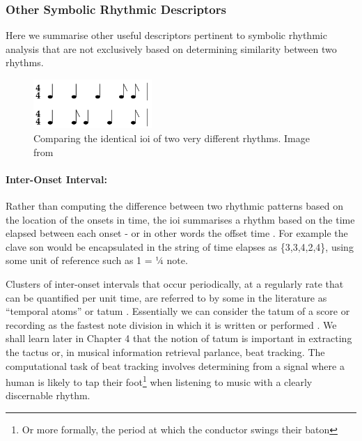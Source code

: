 \subsubsection{Other Symbolic Rhythmic Descriptors}

Here we summarise other useful descriptors pertinent to symbolic rhythmic analysis that are not exclusively based on determining similarity between two rhythms.

\begin{figure}
	\begin{center}
		\includegraphics[width=0.4\textwidth]{ch03_symbolic/figures/ioi_comparison.png}
	\end{center}
	\caption[Comparing the identical IOI of Two Very Different Rhythms.]{Comparing the identical \acrshort{ioi} of two very different rhythms. Image from \cite{Dixon2004} }
	\label{fig:ioi_comparison}
\end{figure}


\paragraph{Inter-Onset Interval:} 
Rather than computing the difference between two rhythmic patterns based on the location of the onsets in time, the \acrfull{ioi} summarises a rhythm based on the time elapsed between each onset - or in other words the offset time \citep{Toussaint2013}. For example the clave son would be encapsulated in the string of time elapses as \{3,3,4,2,4\}, using some unit of reference such as 1 = ¼ note. 

Clusters of inter-onset intervals that occur periodically, at a regularly rate that can be quantified per unit time, are referred to by some in the literature as “temporal atoms” or tatum \citep{Bilmes1993, Sethares2007, Jehan2005}. Essentially we can consider the tatum of a score or recording as the fastest note division in which it is written or performed \citep{Sethares2007}. We shall learn later in Chapter 4 that the notion of tatum is important in extracting the tactus or, in musical information retrieval parlance, beat tracking. The computational task of beat tracking involves determining from a signal where a human is likely to tap their foot\footnote{Or more formally, the period at which the conductor swings their baton} when listening to music with a clearly discernable rhythm. 

